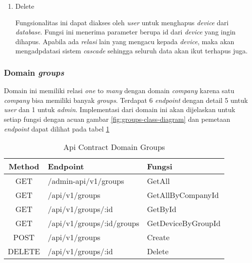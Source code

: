 \begin{enumerate}
  \item Delete

        Fungsionalitas ini dapat diakses oleh \textit{user} untuk menghapus \textit{device} dari \textit{database}. Fungsi ini menerima parameter berupa id dari \textit{device} yang ingin dihapus. Apabila ada \textit{relasi} lain yang mengacu kepada \textit{device}, maka akan mengadpdatasi sistem \textit{cascade} sehingga seluruh data akan ikut terhapus juga.

\end{enumerate}

\subsubsection{Domain \textit{groups}}

Domain ini memiliki relasi \textit{one} to \textit{many} dengan domain \textit{company} karena satu \textit{company} bisa memiliki banyak \textit{groups}. Terdapat 6 \textit{endpoint} dengan detail 5 untuk \textit{user} dan 1 untuk \textit{admin}. Implementasi dari domain ini akan dijelaskan untuk setiap fungsi dengan acuan gambar \ref{fig:groups-class-diagram} dan pemetaan \textit{endpoint} dapat dilihat pada tabel \ref{tab:api-contract-domain-groups}

\bgroup
\begin{table}[ht]
  \caption{Api Contract Domain Groups}
  \label{tab:api-contract-domain-groups}
  \def\arraystretch{1.7}
  \centering
  \begin{tabular}{|c|p{6cm}|p{4cm}|}
    \hline
    Method & Endpoint                  &
    Fungsi                                                  \\
    \hline
    GET    & /admin-api/v1/groups      & GetAll             \\
    \hline
    GET    & /api/v1/groups            & GetAllByCompanyId  \\
    \hline
    GET    & /api/v1/groups/:id        & GetById            \\
    \hline
    GET    & /api/v1/groups/:id/groups & GetDeviceByGroupId \\
    \hline
    POST   & /api/v1/groups            & Create             \\
    \hline
    DELETE & /api/v1/groups/:id        & Delete             \\
    \hline
  \end{tabular}
\end{table}
\egroup

